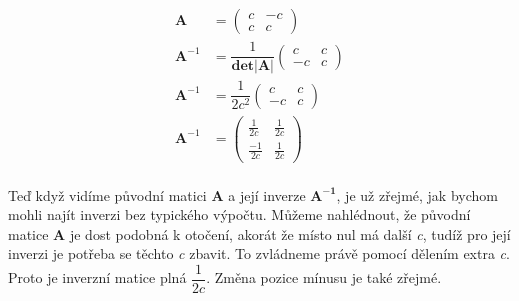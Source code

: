 \documentclass{../../../ksp}
\begin{document}
\begin{equation*}
    \begin{aligned}
        \mathbf{A} & = 
        \begin{pmatrix}
            c & -c\\
            c & c
        \end{pmatrix}\\
        \mathbf{A}^{-1} & = \dfrac{1}{\mathbf{det|A|}}
        \begin{pmatrix}
            c & c\\
            -c & c
        \end{pmatrix}\\
        \mathbf{A}^{-1} & = \dfrac{1}{2c^2}
        \begin{pmatrix}
            c & c\\
            -c & c
        \end{pmatrix}\\
        \mathbf{A}^{-1} & =
        \begin{pmatrix}
            \frac{1}{2c} & \frac{1}{2c}\\
            \frac{-1}{2c} & \frac{1}{2c}
        \end{pmatrix}\\
    \end{aligned}
\end{equation*}

Teď když vidíme původní matici \textbf{A} a její inverze $\mathbf{A^{-1}}$, je už zřejmé,
jak bychom mohli najít inverzi bez typického výpočtu. Můžeme nahlédnout, že původní matice \textbf{A}
je dost podobná k otočení, akorát že místo nul má další \emph{c},
tudíž pro její inverzi je potřeba se těchto \emph{c} zbavit. To zvládneme právě pomocí dělením
extra \emph{c}. Proto je inverzní matice plná $\dfrac{1}{2c}$. Změna pozice mínusu je také zřejmé.
\end{document}
